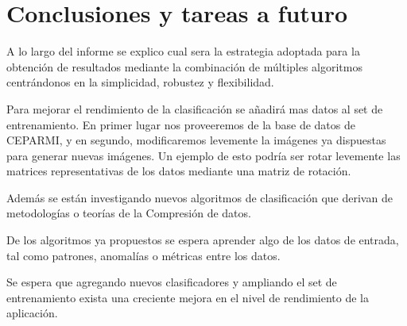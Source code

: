 \chapter{Conclusiones y tareas a futuro}
A lo largo del informe se explico cual sera la estrategia adoptada para la obtención de resultados mediante la combinación de múltiples algoritmos centrándonos en la simplicidad, robustez y flexibilidad. 

Para mejorar el rendimiento de la clasificación se añadirá mas datos al set de entrenamiento. En primer lugar nos proveeremos de la base de datos de CEPARMI, y en segundo, modificaremos levemente la imágenes ya dispuestas para generar nuevas imágenes. Un ejemplo de esto podría ser rotar levemente las matrices representativas de los datos mediante una matriz de rotación.

Además se están investigando nuevos algoritmos de clasificación que derivan de metodologías o teorías de la Compresión de datos.

De los algoritmos ya propuestos se espera aprender algo de los datos de entrada, tal como patrones, anomalías o métricas entre los datos. 

Se espera que agregando nuevos clasificadores y ampliando el set de entrenamiento exista una creciente mejora en el nivel de rendimiento de la aplicación.

